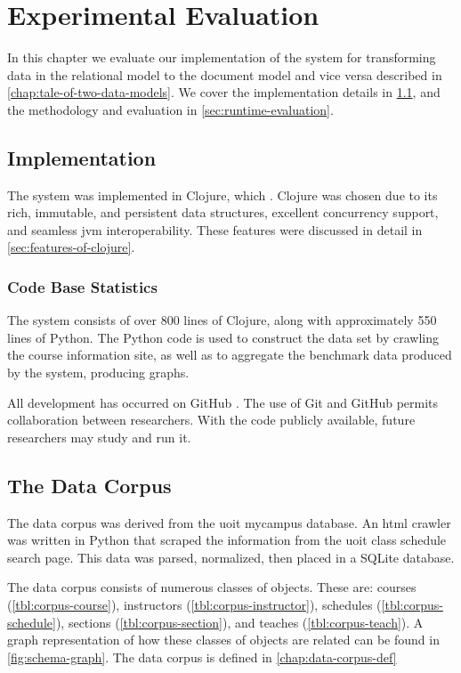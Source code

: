 \chapter{Experimental Evaluation}
\label{chap:experimental-evaluation}
	In this chapter we evaluate our implementation of the system for transforming data in the relational model to the document model and vice versa described in \cref{chap:tale-of-two-data-models}.  We cover the implementation details in \cref{sec:implementation}, and the methodology and evaluation in \cref{sec:runtime-evaluation}.
	
	\section{Implementation}
	\label{sec:implementation}
		The system was implemented in Clojure, which .  Clojure was chosen due to its rich, immutable, and persistent data structures, excellent concurrency support, and seamless \gls{jvm} interoperability.  These features were discussed in detail in \cref{sec:features-of-clojure}.
		
		\subsection{Code Base Statistics}
			The system consists of over 800 lines of Clojure, along with approximately 550 lines of Python.  The Python code is used to construct the data set by crawling the course information site, as well as to aggregate the benchmark data produced by the system, producing graphs.
			
			All development has occurred on GitHub \cite{molly-repo}.  The use of Git and GitHub permits collaboration between researchers.  With the code publicly available, future researchers may study and run it.
	
	\section{The Data Corpus}
	\label{sec:data-corpus}
		The data corpus was derived from the \gls{uoit} mycampus database.  An \gls{html} crawler was written in Python that scraped the information from the \gls{uoit} class schedule search page.  This data was parsed, normalized, then placed in a SQLite database.
		
		The data corpus consists of numerous classes of objects.  These are:  courses (\cref{tbl:corpus-course}), instructors (\cref{tbl:corpus-instructor}), schedules (\cref{tbl:corpus-schedule}), sections (\cref{tbl:corpus-section}), and teaches (\cref{tbl:corpus-teach}).  A graph representation of how these classes of objects are related can be found in \cref{fig:schema-graph}.  The data corpus is defined in \cref{chap:data-corpus-def}
		
